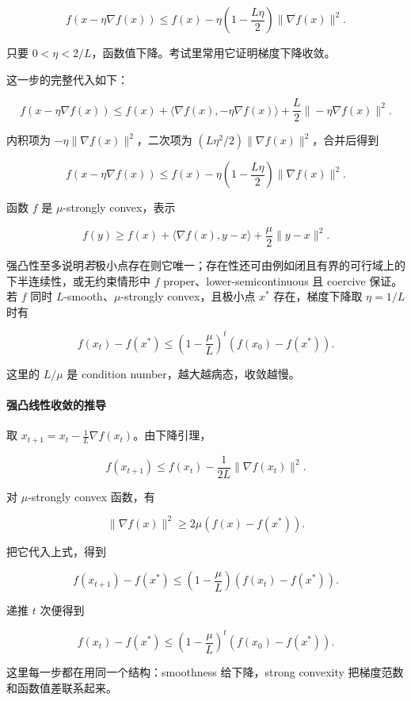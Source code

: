 \documentclass[11pt]{ctexart}
\begin{document}
\[
  f(x-\eta\nabla f(x))
  \le
  f(x)
  -
  \eta\left(1-\frac{L\eta}{2}\right)
  \|\nabla f(x)\|^2.
\]

只要 \(0<\eta<2/L\)，函数值下降。考试里常用它证明梯度下降收敛。

这一步的完整代入如下：

\[
  f(x-\eta\nabla f(x))
  \le
  f(x)
  +
  \langle\nabla f(x),-\eta\nabla f(x)\rangle
  +
  \frac{L}{2}\|-\eta\nabla f(x)\|^2.
\]

内积项为 \(-\eta\|\nabla f(x)\|^2\)，二次项为 \((L\eta^2/2)\|\nabla f(x)\|^2\)，合并后得到

\[
  f(x-\eta\nabla f(x))
  \le
  f(x)
  -
  \eta\left(1-\frac{L\eta}{2}\right)\|\nabla f(x)\|^2.
\]

函数 \(f\) 是 \(\mu\)-strongly convex，表示

\[
  f(y)\ge
  f(x)+\langle\nabla f(x),y-x\rangle
  +\frac{\mu}{2}\|y-x\|^2.
\]

强凸性至多说明\emph{若}极小点存在则它唯一；存在性还可由例如闭且有界的可行域上的下半连续性，或无约束情形中 \(f\) proper、lower-semicontinuous 且 coercive 保证。若 \(f\) 同时 \(L\)-smooth、\(\mu\)-strongly convex，且极小点 \(x^*\) 存在，梯度下降取 \(\eta=1/L\) 时有

\[
  f(x_t)-f(x^*)
  \le
  \left(1-\frac{\mu}{L}\right)^t
  \left(f(x_0)-f(x^*)\right).
\]

这里的 \(L/\mu\) 是 condition number，越大越病态，收敛越慢。

\paragraph{强凸线性收敛的推导}

取 \(x_{t+1}=x_t-\frac1L\nabla f(x_t)\)。由下降引理，

\[
  f(x_{t+1})
  \le
  f(x_t)
  -
  \frac{1}{2L}\|\nabla f(x_t)\|^2.
\]

对 \(\mu\)-strongly convex 函数，有

\[
  \|\nabla f(x)\|^2
  \ge
  2\mu(f(x)-f(x^*)).
\]

把它代入上式，得到

\[
  f(x_{t+1})-f(x^*)
  \le
  \left(1-\frac{\mu}{L}\right)
  (f(x_t)-f(x^*)).
\]

递推 \(t\) 次便得到

\[
  f(x_t)-f(x^*)
  \le
  \left(1-\frac{\mu}{L}\right)^t
  (f(x_0)-f(x^*)).
\]

这里每一步都在用同一个结构：smoothness 给下降，strong convexity 把梯度范数和函数值差联系起来。
\end{document}
